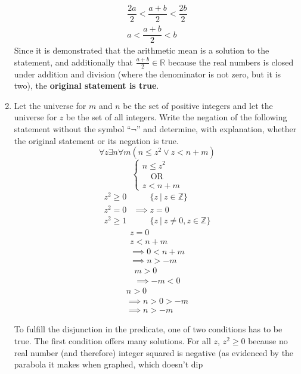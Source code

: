 \documentclass[letterpaper, 12pt]{article}
\newcommand{\keyword}[1]{\textbf{#1}}
\begin{document}
\begin{enumerate}
\begin{flushleft}
\begin{gather*}
    \dfrac{2a}{2} < \dfrac{a + b}{2} < \dfrac{2b}{2} \\
    a < \dfrac{a + b}{2} < b
\end{gather*}
    Since it is demonstrated that the arithmetic mean is a solution to the statement, and 
    additionally that $\frac{a + b}{2} \in \mathbb{R}$ because the real numbers is closed under 
    addition and division (where the denominator is not zero, but it is two), the 
    \keyword{original statement is true}.
\end{flushleft}
\item Let the universe for $m$ and $n$ be the set of positive integers and let the universe for 
$z$ be the set of all integers. Write the negation of the following statement without the symbol 
``$\neg$'' and determine, with explanation, whether the original statement or its negation is true.
\[\forall z \exists n \forall m (n \le z^2 \vee z < n + m)\]
\[\begin{cases}
    n \le z^2 \\
    \quad \text{OR} \\
    z < n + m
\end{cases}\]
\begin{align*}
    z^2 \ge 0 &\qquad \{z \: | \: z \in \mathbb{Z}\} \\
    z^2 = 0 &\implies z = 0 \\
    z^2 \ge 1 &\qquad \{z \: | \: z \ne 0, z \in \mathbb{Z}\}
\end{align*}
\begin{gather*}
    z = 0 \\
    z < n + m \\
    \implies 0 < n + m \\
    \implies n > -m
\end{gather*}
\begin{gather*}
    m > 0 \\
    \implies -m < 0
\end{gather*}
\begin{gather*}
    n > 0 \\
    \implies n > 0 > -m \\
    \implies n > -m
\end{gather*}
\begin{flushleft}
    To fulfill the disjunction in the predicate, one of two conditions has to be true. The first 
    condition offers many solutions. For all $z$, $z^2 \ge 0$ because no real number (and therefore) 
    integer squared is negative (as evidenced by the parabola it makes when graphed, which doesn't dip 

\end{flushleft}
\end{enumerate}
\end{document}
